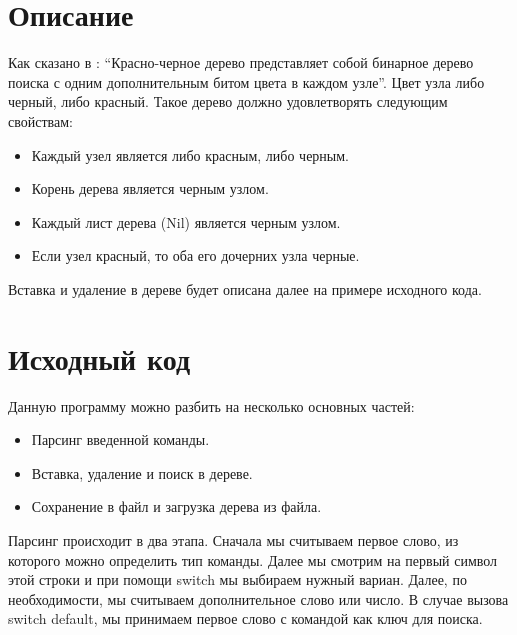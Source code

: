 \section{Описание}
Как сказано в \cite{Kormen}: \enquote{Красно-черное дерево представляет собой бинарное дерево поиска с одним дополнительным битом цвета в каждом узле}. Цвет узла либо черный, либо красный. Такое дерево должно удовлетворять следующим свойствам:
\begin{itemize}
	\item Каждый узел является либо красным, либо черным.
	\item Корень дерева является черным узлом.
	\item Каждый лист дерева (Nil) является черным узлом.
	\item Если узел красный, то оба его дочерних узла черные.
\end{itemize}

Вставка и удаление в дереве будет описана далее на примере исходного кода.
\pagebreak

\section{Исходный код}
Данную программу можно разбить на несколько основных частей:
\begin{itemize}
	\item Парсинг введенной команды.
	\item Вставка, удаление и поиск в дереве.
	\item Сохранение в файл и загрузка дерева из файла.
\end{itemize}

Парсинг происходит в два этапа. Сначала мы считываем первое слово, из которого можно определить тип команды. Далее мы смотрим на первый символ этой строки и при помощи switch мы выбираем нужный вариан. Далее, по необходимости, мы считываем дополнительное слово или число. В случае вызова switch default, мы принимаем первое слово с командой как ключ для поиска.

